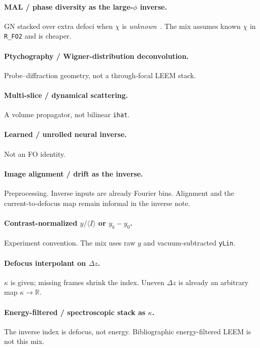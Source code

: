 \documentclass[11pt,a4paper]{article}
\theoremstyle{definition}
\theoremstyle{remark}
\newcommand{\R}{\mathbb{R}}
\newcommand{\Dz}{\Delta z}
\begin{document}
\paragraph{MAL / phase diversity as the large-$\phi$ inverse.}
GN stacked over extra defoci when $\chi$ is \emph{unknown}~\cite{Coene1996}.
The mix assumes known $\chi$ in \texttt{R\_FO2} and is cheaper.

\paragraph{Ptychography / Wigner-distribution deconvolution.}
Probe--diffraction geometry, not a through-focal LEEM stack.

\paragraph{Multi-slice / dynamical scattering.}
A volume propagator, not bilinear \texttt{ihat}.

\paragraph{Learned / unrolled neural inverse.}
Not an FO identity.

\paragraph{Image alignment / drift as the inverse.}
Preprocessing. Inverse inputs are already Fourier bins.
Alignment and the current-to-defocus map remain informal in the
inverse note.

\paragraph{Contrast-normalized $y/\langle I\rangle$ or $y_k-y_0$.}
Experiment convention.
The mix uses raw $y$ and vacuum-subtracted \texttt{yLin}.

\paragraph{Defocus interpolant on $\Dz$.}
$\kappa$ is given; missing frames shrink the index.
Uneven $\Dz$ is already an arbitrary map $\kappa\to\R$.

\paragraph{Energy-filtered / spectroscopic stack as $\kappa$.}
The inverse index is defocus, not energy.
Bibliographic energy-filtered LEEM is not this mix.
\end{document}
